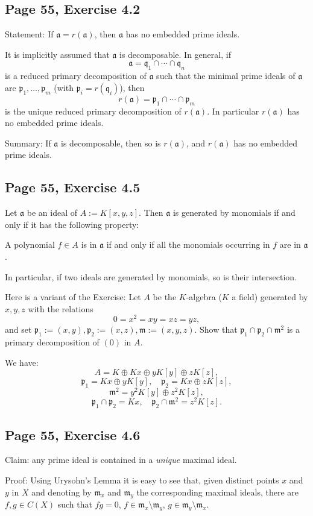 \documentclass[parskip=half,fontsize=12pt]{scrartcl}%
\newcommand{\mf}{\mathfrak}
\newcommand{\aaa}{\mf a}
\newcommand{\mmm}{\mf m}
\newcommand{\ppp}{\mf p}
\newcommand{\qqq}{\mf q}
\begin{document}
\subsection{Page 55, Exercise 4.2}%

Statement: If $\aaa=r(\aaa)$, then $\aaa$ has no embedded prime ideals.

It is implicitly assumed that $\aaa$ is decomposable. In general, if 
$$
\aaa=\qqq_1\cap\cdots\cap\qqq_n
$$ 
is a reduced primary decomposition of $\aaa$ such that the minimal prime ideals of $\aaa$ are $\ppp_1,\dots,\ppp_m$ (with $\ppp_i=r(\qqq_i)$), then 
$$
r(\aaa)=\ppp_1\cap\cdots\cap\ppp_m
$$ 
is the unique reduced primary decomposition of $r(\aaa)$. In particular $r(\aaa)$ has no embedded prime ideals. 

Summary: If $\aaa$ is decomposable, then so is $r(\aaa)$, and $r(\aaa)$ has no embedded prime ideals. 

\subsection{Page 55, Exercise 4.5}%

Let $\aaa$ be an ideal of $A:=K[x,y,z]$. Then $\aaa$ is generated by monomials if and only if it has the following property:

A polynomial $f\in A$ is in $\aaa$ if and only if all the monomials occurring in $f$ are in $\aaa$.

In particular, if two ideals are generated by monomials, so is their intersection.

Here is a variant of the Exercise: Let $A$ be the $K$-algebra ($K$ a field) generated by $x,y,z$ with the relations 
$$
0=x^2=xy=xz=yz,
$$ 
and set $\ppp_1:=(x,y),\ppp_2:=(x,z),\mmm:=(x,y,z)$. Show that $\ppp_1\cap\ppp_2\cap\mmm^2$ is a primary decomposition of $(0)$ in $A$.

We have:
$$
A=K\oplus Kx\oplus yK[y]\oplus zK[z],
$$ 
$$
\ppp_1=Kx\oplus yK[y],\quad\ppp_2=Kx\oplus zK[z],
$$ 
$$
\mmm^2=y^2K[y]\oplus z^2K[z],
$$ 
$$ 
\ppp_1\cap\ppp_2=Kx,\quad\ppp_2\cap\mmm^2=z^2K[z].
$$

\subsection{Page 55, Exercise 4.6}%

Claim: any prime ideal is contained in a \emph{unique} maximal ideal.

Proof: Using Urysohn's Lemma it is easy to see that, given distinct points $x$ and $y$ in $X$ and denoting by $\mmm_x$ and $\mmm_y$ the corresponding maximal ideals, there are $f,g\in C(X)$ such that $fg=0$, $f\in\mmm_x\setminus\mmm_y$, $g\in\mmm_y\setminus\mmm_x$. 
\end{document}

